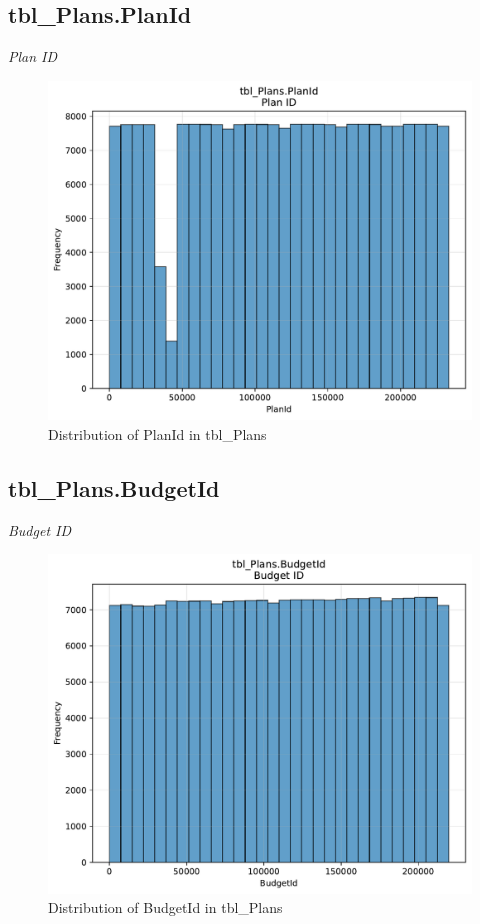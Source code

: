 \subsection{tbl\_Plans.PlanId}
\textit{Plan ID}

\begin{figure}[htbp]
\centering
\includegraphics[width=\textwidth]{figures/dbo_tbl_Plans_PlanId.pdf}
\caption{Distribution of PlanId in tbl\_Plans}
\end{figure}\newpage

\subsection{tbl\_Plans.BudgetId}
\textit{Budget ID}

\begin{figure}[htbp]
\centering
\includegraphics[width=\textwidth]{figures/dbo_tbl_Plans_BudgetId.pdf}
\caption{Distribution of BudgetId in tbl\_Plans}
\end{figure}\newpage

